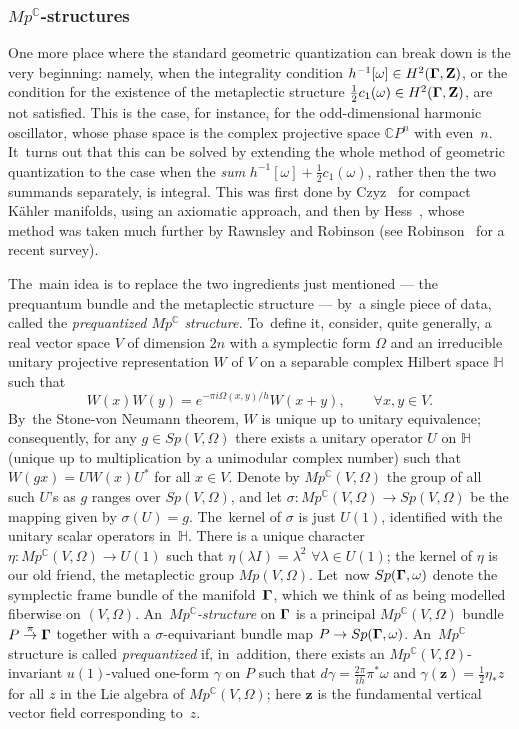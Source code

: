 \documentclass[12pt]{amsart}
\numberwithin{equation}{section}
\theoremstyle{remark}
\let\Bbb\mathbb \let\Cal\mathcal \let\frak\mathfrak
\let\boldkey\mathbf \let\bold\mathbf
\newcommand\Omg{{\bigam}}   %
\newcommand\OMEGA{\Omega}
\newcommand\ZZ{\bold Z}
\newcommand{\CC}{\C}
\newcommand{\bigam}{\mbox{\boldmath $\Gamma$}}
\newcommand{\C}{\mathbb C}
\begin{document}
\subsubsection{$Mp^\CC$-structures} \label{sec263}
One more place where the standard geometric quantization can break down is the
very beginning: namely, when the integrality condition $h^{-1}[\omega]\in
H^2(\Omg,\ZZ)$, or the condition for the existence of the metaplectic structure
$\frac12 c_1(\omega)\in H^2(\Omg,\ZZ)$, are not satisfied. This is the case,
for instance, for the odd-dimensional harmonic oscillator, whose phase space is
the complex projective space $\CC P^n$ with even~$n$. It~turns out that this
can be solved by extending the whole method of geometric quantization to the
case when the {\it sum} $h^{-1}[\omega] + \frac12 c_1(\omega)$, rather
then the two summands separately, is integral. This was first done by
Czyz~\cite{bib:Czyz} for compact K\"ahler manifolds, using an axiomatic
approach, and then by Hess~\cite{bib:Hess}, whose method was taken much further
by Rawnsley and Robinson \cite{bib:RawnRob} (see Robinson~\cite{bib:RobiSURV}
for a recent survey).

The~main idea is to replace the two ingredients just mentioned --- the
prequantum bundle and the metaplectic structure --- by~a single piece of data,
called the {\it prequantized $Mp^\CC$ structure.\/} To~define it, consider,
quite generally, a real vector space $V$ of dimension $2n$ with a symplectic
form $\OMEGA$ and an irreducible unitary projective representation $W$ of $V$
on a separable complex Hilbert space $\Bbb H$ such that
$$ W(x) W(y) = e^{-\pi i \OMEGA(x,y)/h} W(x+y),  \qquad \forall x,y\in V.  $$
By~the Stone-von Neumann theorem, $W$ is unique up to unitary equivalence;
consequently, for any $g\in Sp(V,\OMEGA)$ there exists a unitary operator $U$
on $\Bbb H$ (unique up to multiplication by a unimodular complex number) such
that $W(gx)=UW(x)U^*$ for all $x\in V$. Denote by $Mp^\CC(V,\OMEGA)$ the group
of all such $U$'s as $g$ ranges over $Sp(V,\OMEGA)$, and let
$\sigma:Mp^\CC(V,\OMEGA)\to Sp(V,\OMEGA)$ be the mapping given by
$\sigma(U)=g$. The~kernel of $\sigma$ is just $U(1)$, identified with the
unitary scalar operators in~$\Bbb H$. There is a unique character $\eta:
Mp^\CC(V,\OMEGA)\to U(1)$ such that $\eta(\lambda I)=\lambda^2$ $\forall\lambda
\in U(1)$; the kernel of $\eta$ is our old friend, the metaplectic group
$Mp(V,\OMEGA)$. Let~now $Sp(\Omg,\omega)$ denote the symplectic frame bundle of
the manifold~$\Omg$, which we think of as being modelled fiberwise on
$(V,\OMEGA)$. An~{\it $Mp^\CC$-structure\/} on $\Omg$ is a principal
$Mp^\CC(V,\OMEGA)$ bundle $P\overset{\pi}{\to}\Omg$ together with a
$\sigma$-equivariant bundle map $P\to Sp(\Omg,\omega)$. An~$Mp^\CC$ structure
is called {\it prequantized\/} if, in~addition, there exists an
$Mp^\CC(V,\OMEGA)$-invariant $u(1)$-valued one-form $\gamma$ on $P$ such that
$d\gamma=\frac{2\pi}{ih} \pi^*\omega$ and $\gamma(\boldkey z)=\frac12\eta_*z$
for all $z$ in the Lie algebra of $Mp^\CC(V,\OMEGA)$; here $\boldkey z$ is the
fundamental vertical vector field corresponding to~$z$.
\end{document}
